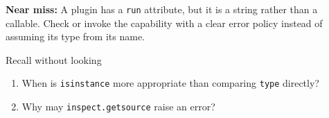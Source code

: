 \documentclass[11pt]{article}
\begin{document}
\begin{keepsection}
\begin{notebox}\textbf{Near miss:} A plugin has a \texttt{run} attribute, but it is a string rather than a callable. Check or invoke the capability with a clear error policy instead of assuming its type from its name.\end{notebox}

\begin{recallbox}{Recall without looking}
\begin{enumerate}
\item When is \texttt{isinstance} more appropriate than comparing \texttt{type} directly?
\item Why may \texttt{inspect.getsource} raise an error?
\end{enumerate}

\end{recallbox}
\end{keepsection}
\end{document}
